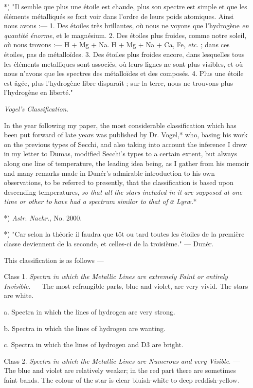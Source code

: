 \documentclass[a4paper, 12pt, oneside, polutonikogreek, english]{article}
\begin{document}
*) "Il semble que plus une étoile est chaude, plus son spectre est simple et que les éléments métalliqués se font voir dans l'ordre de leurs poids atomiques. Ainsi nous avons :--- 1. Des étoiles très brillantes, où nous ne voyons que l'hydrogène \emph{en quantité énorme}, et le magnésium. 2. Des étoiles plus froides, comme notre soleil, où nous trovons :--- H + Mg + Na. H + Mg + Na + Ca, Fe, \emph{etc.} ; dans ces étoiles, pas de métalloïdes. 3. Des étoiles plus froides encore, dans lesquelles tous les éléments metalliques sont associés, où leurs lignes ne sont plus visibles, et où nous n'avons que les spectres des métalloïdes et des composés. 4. Plus une étoile est âgée, plus l'hydrogène libre disparaît ; sur la terre, nous ne trouvons plus l'hydrogène en liberté."

\emph{Vogel's Classification.}

In the year following my paper, the most considerable classification which has been put forward of late years was published by Dr. Vogel,* who, basing his work on the previous types of Secchi, and also taking into account the inference I drew in my letter to Dumas, modified Secchi's types to a certain extent, but always along one line of temperature, the leading idea being, as I gather from his memoir and many remarks made in Dunér's admirable introduction to his own observations, to be referred to presently, that the classification is based upon descending temperatures, \emph{so that all the stars included in it are supposed at one time or other to have had a spectrum similar to that of α Lyræ}.*

*) \emph{Astr. Nachr.}, No. 2000.

*) "Car selon la théorie il faudra que tôt ou tard toutes les étoiles de la première classe deviennent de la seconde, et celles-ci de la troisième." --- Dunér.

This classification is as follows ---

Class 1. \emph{Spectra in which the Metallic Lines are extremely Faint or entirely Invisible.} --- The most refrangible parts, blue and violet, are very vivid. The stars are white.

a. Spectra in which the lines of hydrogen are very strong.

b. Spectra in which the lines of hydrogen are wanting.

c. Spectra in which the lines of hydrogen and D3 are bright.

Class 2. \emph{Spectra in which the Metallic Lines are Numerous and very Visible.} --- The blue and violet are relatively weaker; in the red part there are sometimes faint bands. The colour of the star is clear bluish-white to deep reddish-yellow.
\end{document}
